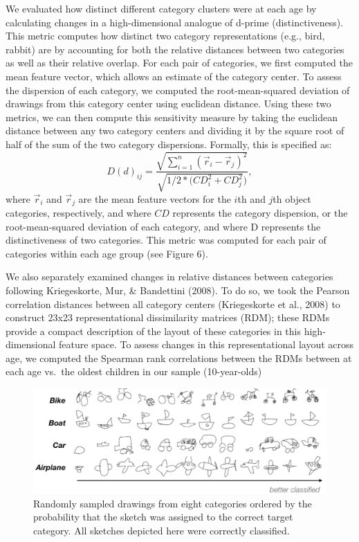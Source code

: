 \documentclass[10pt, letterpaper]{article}
\newenvironment{CodeChunk}{}{}
\begin{document}
We evaluated how distinct different category clusters were at each age
by calculating changes in a high-dimensional analogue of d-prime
(distinctiveness). This metric computes how distinct two category
representations (e.g., bird, rabbit) are by accounting for both the
relative distances between two categories as well as their relative
overlap. For each pair of categories, we first computed the mean feature
vector, which allows an estimate of the category center. To assess the
dispersion of each category, we computed the root-mean-squared deviation
of drawings from this category center using euclidean distance. Using
these two metrics, we can then compute this sensitivity measure by
taking the euclidean distance between any two category centers and
dividing it by the square root of half of the sum of the two category
dispersions. Formally, this is specified as:
\[D(d)_{ij} = \frac{\sqrt{\sum_{i=1}^n (\vec{r}_{i}-\vec{r}_{j})^2}} {\sqrt{1/2 * (CD_{i}^2 + CD_{j}^2})},\]
where \(\vec{r}_{i}\) and \(\vec{r}_{j}\) are the mean feature vectors
for the \(i\)th and \(j\)th object categories, respectively, and where
\(CD\) represents the category dispersion, or the root-mean-squared
deviation of each category, and where D represents the distinctiveness
of two categories. This metric was computed for each pair of categories
within each age group (see Figure 6).

We also separately examined changes in relative distances between
categories following Kriegeskorte, Mur, \& Bandettini (2008). To do so,
we took the Pearson correlation distances between all category centers
(Kriegeskorte et al., 2008) to construct 23x23 representational
dissimilarity matrices (RDM); these RDMs provide a compact description
of the layout of these categories in this high-dimensional feature
space. To assess changes in this representational layout across age, we
computed the Spearman rank correlations between the RDMs between at each
age vs.~the oldest children in our sample (10-year-olds)

\begin{CodeChunk}
\begin{figure}[h]

{\centering \includegraphics{figs/drawingExamples-1} 

}

\caption[Randomly sampled drawings from eight categories ordered by the probability that the sketch was assigned to the correct target category]{Randomly sampled drawings from eight categories ordered by the probability that the sketch was assigned to the correct target category. All sketches depicted here were correctly classified.}\label{fig:drawingExamples}
\end{figure}
\end{CodeChunk}
\end{document}
